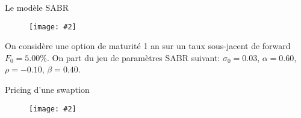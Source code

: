 \documentclass{beamer}
\newcommand{\FIG}[2]{\texttt{[image: \#2]}}
\begin{document}
\begin{frame}{Le modèle SABR}
\begin{figure}[h]
\FIG{7cm}{figures/sabr_impact_param.jpg}
\end{figure}
On considère une option de maturité 1 an sur un taux sous-jacent de forward $F_0=5.00\%$. On part du jeu de paramètres SABR suivant: $\sigma_0=0.03$, $\alpha=0.60$, $\rho=-0.10$, $\beta=0.40$.
\end{frame}

\begin{frame}{Pricing d'une swaption}
\begin{figure}[h]
\FIG{6cm}{figures/SwaptionPrice.jpg}
\end{figure}
\end{frame}
\end{document}
